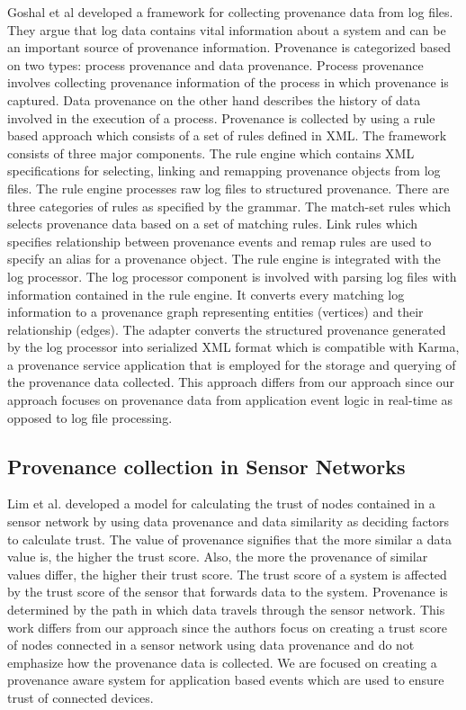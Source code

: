 Goshal et al \cite{ghoshal_provenance_2013} developed a framework for collecting provenance data from log files. They argue that log data contains vital information about a system and can be an important source of provenance information. Provenance is categorized based on two types: process provenance and data provenance. Process provenance involves collecting provenance information of the process in which provenance is captured. Data provenance on the other hand describes the history of data involved in the execution of a process. Provenance is collected by using a rule based approach which consists of a set of rules defined in XML. The framework consists of three major components. The rule engine which contains XML specifications for selecting, linking and remapping provenance objects from log files. The rule engine processes raw log files to structured provenance. There are three categories of rules as specified by the grammar. The match-set rules which selects provenance data based on a set of matching rules. Link rules which specifies relationship between provenance events and remap rules are used to specify an alias for a provenance object. The rule engine is integrated with the log processor. The log processor component is involved with parsing log files with information contained in the rule engine. It converts every matching log information to a provenance graph representing entities (vertices) and their relationship (edges). The adapter converts the structured provenance generated by the log processor into serialized XML format which is compatible with Karma, a provenance service application that is employed for the storage and querying of the provenance data collected. This approach differs from our approach since our approach focuses on provenance data from application event logic in real-time as opposed to log file processing.

\subsection{Provenance collection in Sensor Networks}
Lim et al. \cite{lim} developed a
model for calculating the trust of nodes contained in a sensor network by using data
provenance and data similarity as deciding factors to calculate trust. The value of
provenance signifies that the more similar a data value is, the higher the trust score.
Also, the more the provenance of similar values differ, the higher their trust score. The trust score of a system is affected by the trust score of the sensor that forwards data to the system. Provenance is determined by the path in which data travels through the sensor network. This work differs from our approach since the authors focus on creating a trust score
of nodes connected in a sensor network using data provenance and do not emphasize
how the provenance data is collected. We are focused on creating a
provenance aware system for application based events which are used to ensure trust of
connected devices. 

